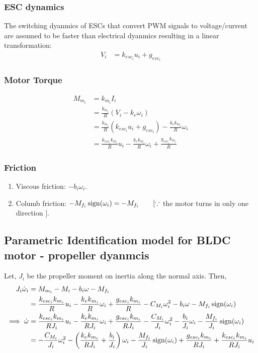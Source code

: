 \subsubsection{ESC dynamics}
The switching dyanmics of ESCs that convert PWM signals to voltage/current are assumed to be faster than electrical dyanmics resulting in a linear transformation:
\begin{align*}
    V_i &= k_{esc_i} u_i + g_{esc_i}
\end{align*}

\subsubsection{Motor Torque}
\begin{align*}
    M_{m_i} &= k_{m_i} I_i\\
            &= \frac{k_{m_i}}{R} \left( V_i - k_e \omega_i \right)\\
            &= \frac{k_{m_i}}{R} \left( k_{esc_i} u_i + g_{esc_i} \right) - \frac{k_ek_{m_i}}{R} \omega_i\\
            &= \frac{k_{esc_i}k_{m_i}}{R}  u_i  - \frac{k_ek_{m_i}}{R} \omega_i+ \frac{g_{esc_i}k_{m_i}}{R}
\end{align*}

\subsubsection{Friction}
\begin{enumerate}
    \item Viscous friction: $-b_i \omega_i$.
    \item Columb friction: $-M_{f_i} \operatorname{sign}(\omega_i) = -M_{f_i} \qquad [\because$ the motor turns in only one direction $]$.
\end{enumerate}



\subsection{Parametric Identification model for BLDC motor - propeller dyanmcis}
Let, $J_i$ be the propeller moment on inertia along the normal axis. Then,
\begin{align*}
    J_i \dot \omega_i &= M_{m_i} - M_i - b_i \omega - M_{f_i}\\
    &= \frac{k_{esc_i}k_{m_i}}{R}  u_i  - \frac{k_ek_{m_i}}{R} \omega_i+ \frac{g_{esc_i}k_{m_i}}{R} - C_{M_i} \omega_i^2 - b_i \omega - M_{f_i}\operatorname{sign}(\omega_i)\\
   \implies \dot \omega &= \frac{k_{esc_i}k_{m_i}}{R J_i}  u_i  - \frac{k_ek_{m_i}}{R J_i} \omega_i+ \frac{g_{esc_i}k_{m_i}}{R J_i} - \frac{C_{M_i}}{J_i} \omega_i^2 - \frac{b_i}{J_i} \omega_i - \frac{M_{f_i}}{J_i}\operatorname{sign}(\omega_i)\\
   &= - \frac{C_{M_i}}{J_i} \omega_i^2  - \left(\frac{k_ek_{m_i}}{R J_i} + \frac{b_i}{J_i} \right) \omega_i - \frac{M_{f_i}}{J_i}\operatorname{sign}(\omega_i) +  \frac{g_{esc_i}k_{m_i}}{R J_i} + \frac{k_{esc_i}k_{m_i}}{R J_i}  u_i
\end{align*}

